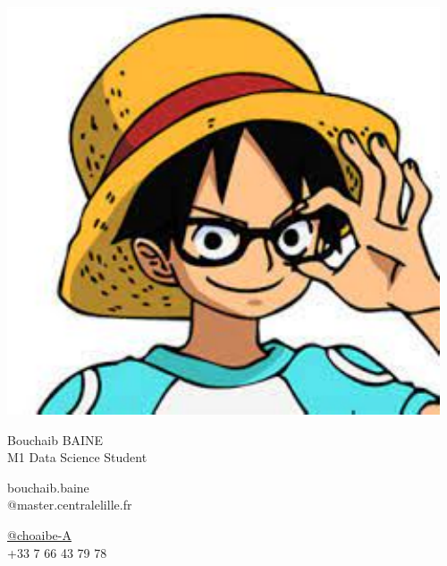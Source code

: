 \documentclass{article}
\begin{document}
\centering \includegraphics[width=0.25\linewidth]{logo}\\[5pt]
\parbox{2in}{\Large \centering  Bouchaib BAINE\\[1pt]
\normalsize M1 Data Science Student}

\vfill
\raggedright
\begin{multicols}{2}
bouchaib.baine\\
@master.centralelille.fr

\columnbreak
\raggedleft
\href{https://github.com/choaibe-A}{@choaibe-A}\\
+33 7 66 43 79 78%
\end{multicols}%
\end{document}
